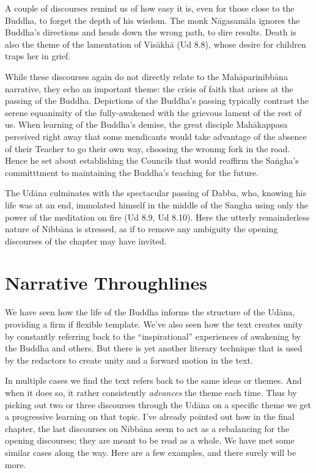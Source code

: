 \documentclass[12pt,openany]{book}%
\begin{document}
A couple of discourses remind us of how easy it is, even for those close to the Buddha, to forget the depth of his wisdom. The monk \textsanskrit{Nāgasamāla} ignores the Buddha’s directions and heads down the wrong path, to dire results. Death is also the theme of the lamentation of \textsanskrit{Visākhā} (Ud 8.8), whose desire for children traps her in grief. 

While these discourses again do not directly relate to the \textsanskrit{Mahāparinibbāna} narrative, they echo an important theme: the crisis of faith that arises at the passing of the Buddha. Depictions of the Buddha’s passing typically contrast the serene equanimity of the fully-awakened with the grievous lament of the rest of us. When learning of the Buddha’s demise, the great disciple \textsanskrit{Mahākappasa} perceived right away that some mendicants would take advantage of the absence of their Teacher to go their own way, choosing the wronmg fork in the road. Hence he set about establishing the Councils that would reaffirm the \textsanskrit{Saṅgha}’s committtment to maintaining the Buddha’s teaching for the future.

The \textsanskrit{Udāna} culminates with the spectacular passing of Dabba, who, knowing his life was at an end, immolated himself in the middle of the Sangha using only the power of the meditation on fire (Ud 8.9, Ud 8.10). Here the utterly remainderless nature of \textsanskrit{Nibbāna} is stressed, as if to remove any ambiguity the opening discourses of the chapter may have invited. 

\section*{Narrative Throughlines}

We have seen how the life of the Buddha informs the structure of the \textsanskrit{Udāna}, providing a firm if flexible template. We’ve also seen how the text creates unity by constantly referring back to the “inspirational” experiences of awakening by the Buddha and others. But there is yet another literary technique that is used by the redactors to create unity and a forward motion in the text. 

In multiple cases we find the text refers back to the same ideas or themes. And when it does so, it rather consistently \emph{advances} the theme each time. Thus by picking out two or three discourses through the \textsanskrit{Udāna} on a specific theme we get a progressive learning on that topic. I’ve already pointed out how in the final chapter, the last discourses on \textsanskrit{Nibbāna} seem to act as a rebalancing for the opening discourses; they are meant to be read as a whole. We have met some similar cases along the way. Here are a few examples, and there surely will be more.
\end{document}
